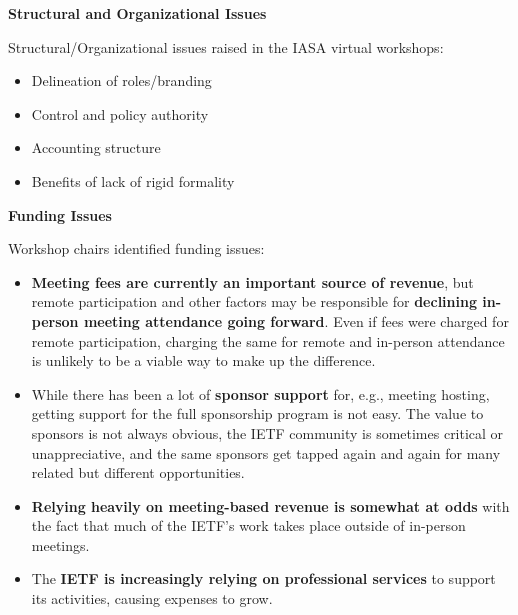 \documentclass[helvetica]{seminar}
\newcommand{\heading}[1]{%
  \begin{center} 
    \large\bf 
    #1 
  \end{center} 
  \vspace{.4 in}}
\begin{document}
\begin{slide}
\heading{Structural and Organizational Issues}

Structural/Organizational issues raised in the IASA virtual workshops:
\begin{itemize}
\item Delineation of roles/branding
\item Control and policy authority
\item Accounting structure
\item Benefits of lack of rigid formality
\end{itemize}

\end{slide}


\begin{slide}
\heading{Funding Issues}

Workshop chairs identified funding issues:
{\footnotesize
\begin{itemize}
\item \textbf{Meeting fees are currently an important source of
  revenue}, but remote participation and other factors may be
  responsible for \textbf{declining in-person meeting attendance going
    forward}.  Even if fees were charged for remote participation,
  charging the same for remote and in-person attendance is unlikely to
  be a viable way to make up the difference.
\item While there has been a lot of \textbf{sponsor support} for,
  e.g., meeting hosting, getting support for the full sponsorship
  program is not easy.  The value to sponsors is not always obvious,
  the IETF community is sometimes critical or unappreciative, and the
  same sponsors get tapped again and again for many related but
  different opportunities.
\item \textbf{Relying heavily on meeting-based revenue is somewhat at
  odds} with the fact that much of the IETF's work takes place outside
  of in-person meetings.
\item The \textbf{IETF is increasingly relying on professional
  services} to support its activities, causing expenses to grow.
\end{itemize}
}

\end{slide}
\end{document}
